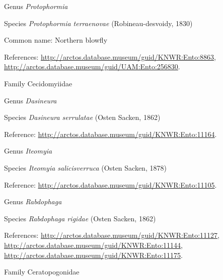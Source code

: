 \documentclass[9pt, article]{memoir}
\begin{document}
\begin{multicols}{2}
\vspace{6pt}\noindent\hspace{30pt}Genus \textit{Protophormia}


\vspace{6pt}\noindent\hspace{36pt}Species \textit{Protophormia terraenovae} (Robineau-desvoidy, 1830)


Common name: Northern blowfly

References: 
\url{http://arctos.database.museum/guid/KNWR:Ento:8863}, 
\url{http://arctos.database.museum/guid/UAM:Ento:256830}.

\vspace{6pt}\noindent\hspace{24pt}Family Cecidomyiidae


\vspace{6pt}\noindent\hspace{30pt}Genus \textit{Dasineura}


\vspace{6pt}\noindent\hspace{36pt}Species \textit{Dasineura serrulatae} (Osten Sacken, 1862)


Reference: 
\url{http://arctos.database.museum/guid/KNWR:Ento:11164}.

\vspace{6pt}\noindent\hspace{30pt}Genus \textit{Iteomyia}


\vspace{6pt}\noindent\hspace{36pt}Species \textit{Iteomyia salicisverruca} (Osten Sacken, 1878)


Reference: 
\url{http://arctos.database.museum/guid/KNWR:Ento:11105}.

\vspace{6pt}\noindent\hspace{30pt}Genus \textit{Rabdophaga}


\vspace{6pt}\noindent\hspace{36pt}Species \textit{Rabdophaga rigidae} (Osten Sacken, 1862)


References: 
\url{http://arctos.database.museum/guid/KNWR:Ento:11127}, 
\url{http://arctos.database.museum/guid/KNWR:Ento:11144}, 
\url{http://arctos.database.museum/guid/KNWR:Ento:11175}.

\vspace{6pt}\noindent\hspace{24pt}Family Ceratopogonidae



\end{multicols}
\end{document}
